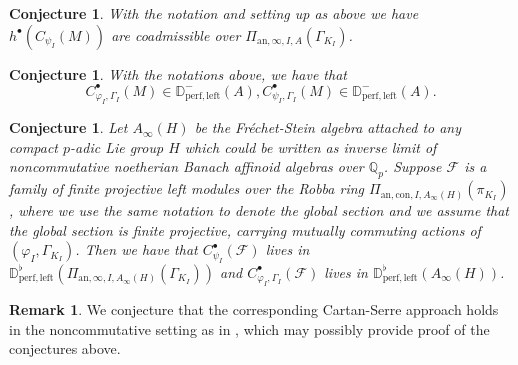 \documentclass[12pt]{amsart}
\newtheorem{conjecture}[theorem]{Conjecture}
\theoremstyle{definition}
\newtheorem{remark}[theorem]{Remark}
\numberwithin{equation}{section}
\begin{document}
\begin{conjecture} \label{conjecture5.22}
With the notation and setting up as above we have $h^\bullet(C_{\psi_I}(M))$ are coadmissible over $\Pi_{\mathrm{an},\infty,I,A}(\Gamma_{K_I})$.	
\end{conjecture}






\begin{conjecture} \label{conjecture5.23}
With the notations above, we have that 
\begin{displaymath}
C^\bullet_{\varphi_I,\Gamma_{I}}(M)\in \mathbb{D}_\mathrm{perf,left}^-(A), C^\bullet_{\psi_I,\Gamma_{I}}(M)\in \mathbb{D}_\mathrm{perf,left}^-(A).
\end{displaymath}
\end{conjecture}


\begin{conjecture} \label{conjecture5.24}
Let $A_\infty(H)$ be the Fr\'echet-Stein algebra attached to any compact $p$-adic Lie group $H$ which could be written as inverse limit of noncommutative noetherian Banach affinoid algebras over $\mathbb{Q}_p$. Suppose $\mathcal{F}$ is a family of finite projective left modules over the Robba ring $\Pi_{\mathrm{an},\mathrm{con},I,A_\infty(H)}(\pi_{K_I})$, where we use the same notation to denote the global section and we assume that the global section is finite projective, carrying mutually commuting actions of $(\varphi_I,\Gamma_{K_I})$. Then we have that $C^\bullet_{\psi_I}(\mathcal{F})$ lives in $\mathbb{D}^\flat_{\mathrm{perf,left}}(\Pi_{\mathrm{an},\infty,I,A_\infty(H)}(\Gamma_{K_I}))$ and $C^\bullet_{\varphi_I,\Gamma_I}(\mathcal{F})$ lives in $\mathbb{D}^\flat_{\mathrm{perf,left}}(A_\infty(H))$. 
\end{conjecture}


\begin{remark}
We conjecture that the corresponding Cartan-Serre approach holds in the noncommutative setting as in \cite[Lemma1.10]{KL3}, which may possibly provide proof of the conjectures above.	
\end{remark}
\end{document}
